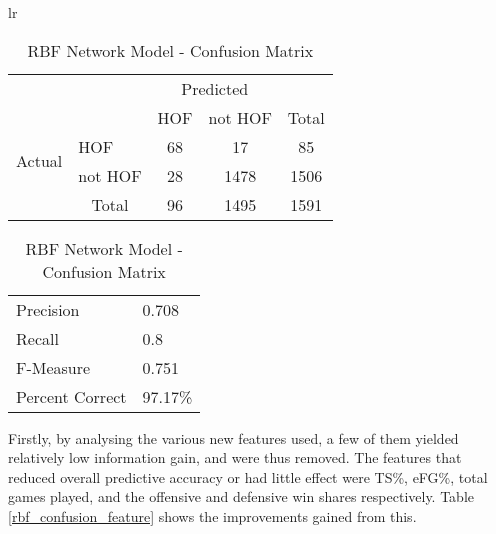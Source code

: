 \documentclass[paper=a4, fontsize=11pt]{scrartcl} %
\numberwithin{equation}{section} %
\numberwithin{figure}{section} %
\numberwithin{table}{section} %
\begin{document}
\begin{table}[thb]
\centering
\caption{\label{rbf_confusion}RBF Network Model - Confusion Matrix}
\begin{tabular}{lr}

\begin{tabular}{l|l|c|c|c}
\multicolumn{2}{c}{}&\multicolumn{2}{c}{Predicted}&\\
\cline{3-4}
\multicolumn{2}{c|}{}& HOF & not HOF &\multicolumn{1}{c}{Total}\\
\cline{2-4}
\multirow{2}{*}{Actual}& HOF & 68 & 17 & 85\\
\cline{2-4}
& not HOF & 28 & 1478 & 1506\\
\cline{2-4}
\multicolumn{1}{c}{} & \multicolumn{1}{c}{Total} & \multicolumn{1}{c}{96} & \multicolumn{1}{c}{1495} & \multicolumn{1}{c}{1591}\\
\end{tabular}

\begin{tabular}{ | l | l | }
\hline
  Precision & 0.708 \\
  Recall & 0.8  \\
  F-Measure & 0.751 \\
  Percent Correct & 97.17\%\\
  \hline
\end{tabular}

\end{tabular}
\end{table}

Firstly, by analysing the various new features used, a few of them yielded relatively low information gain, and were thus removed. The features that reduced overall predictive accuracy or had little effect were TS\%, eFG\%, total games played, and the offensive and defensive win shares respectively. Table \ref{rbf_confusion_feature} shows the improvements gained from this.

\pagebreak
\end{document}
